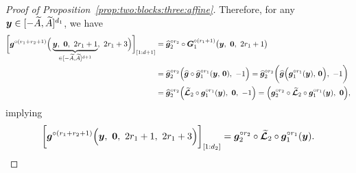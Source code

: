 \documentclass[nohyperref]{article}
\theoremstyle{plain}
\theoremstyle{definition}
\theoremstyle{remark}
\begin{document}
\begin{proof}[Proof of Proposition~\ref{prop:two:blocks:three:affine}]
	
	Therefore, for any ${\bm{y}}\in [-{\widetilde{A}},{\widetilde{A}}]^{d_1}$,
	we have
	\begin{equation*}
		\begin{split}
			\bigg[{\bm{g}}^{\circ (r_1+r_2+1)}\Big(
			\underbrace{{\bm{y}},\   {\bm{0}},\  2r_1+1}_{\in [-{\widetilde{A}},{\widetilde{A}}]^{d+1}},
			\  2r_1+3\Big)\bigg]_{[1:d+1]}
			&=
			{\bm{\widehat{g}}}_2^{\circ r_2}\circ {\bm{G}}_1^{\circ (r_1+1)}\big(
			{\bm{y}},\   {\bm{0}},\  2r_1+1\big)\\
			& = {\bm{\widehat{g}}}_2^{\circ r_2}\Big({\bm{\widehat{g}}} \circ {\bm{\widehat{g}}}_1^{\circ r_1}({\bm{y}},\, {\bm{0}}),\    -1\Big) 
			= {\bm{\widehat{g}}}_2^{\circ r_2}\bigg({\bm{\widehat{g}}} \Big({\bm{g}}_1^{\circ r_1}({\bm{y}}),\, {\bm{0}}\Big),\    -1\bigg)\\
			&  = {\bm{\widehat{g}}}_2^{\circ r_2} \Big({\bm{\mathcal{\widetilde{L}}}}_2\circ{\bm{g}}_1^{\circ r_1}({\bm{y}}),\   {\bm{0}},\  -1\Big)  =  \Big({\bm{g}}_2^{\circ r_2}\circ{\bm{\mathcal{\widetilde{L}}}}_2\circ{\bm{g}}_1^{\circ r_1}({\bm{y}}),\   {\bm{0}}\Big),\\
		\end{split}
	\end{equation*}
	implying
	\begin{equation*}
		\begin{split}
			\bigg[{\bm{g}}^{\circ (r_1+r_2+1)}\Big(
			{\bm{y}},\   {\bm{0}},\  2r_1+1,
			\  2r_1+3\Big)\bigg]_{[1:d_2]}
			= {\bm{g}}_2^{\circ r_2}\circ{\bm{\mathcal{\widetilde{L}}}}_2\circ{\bm{g}}_1^{\circ r_1}({\bm{y}}).
		\end{split}
	\end{equation*}
	

\end{proof}
\end{document}
